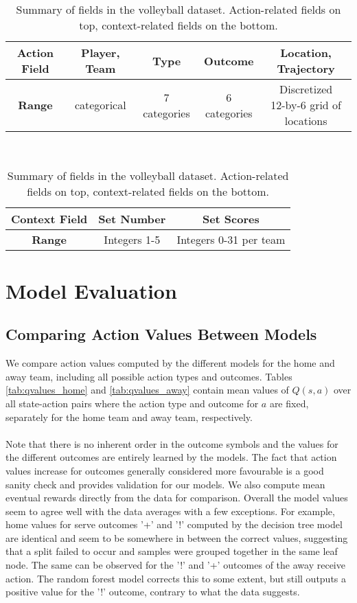 \documentclass{sfuthesis}
\begin{document}
	\begin{table}[ht]
		\centering
		\begin{tabular}{c|c|c|c|c}
			\textbf{Action Field} & \textbf{Player, Team} & \textbf{Type} & \textbf{Outcome} & \textbf{Location, Trajectory}         \\ \hline
			\textbf{Range} & categorical           & 7 categories  & 6 categories     & \makecell[c]{Discretized\\ 12-by-6 grid of locations}
		\end{tabular}
		\\ \vspace{0.75cm}
		\begin{tabular}{c|c|c}
			\textbf{Context Field} & \textbf{Set Number} & \textbf{Set Scores}    \\ \hline
			\textbf{Range} & Integers 1-5        & Integers 0-31 per team
		\end{tabular}
		\caption{Summary of fields in the volleyball dataset. Action-related fields on top, context-related fields on the bottom.}
		\label{tab:data-fields}
	\end{table}
	
	\chapter{Model Evaluation}
	
	\section{Comparing Action Values Between Models}
	
	We compare action values computed by the different models for the home and away team, including all possible action types and outcomes. Tables \ref{tab:qvalues_home} and \ref{tab:qvalues_away} contain mean values of $Q(s,a)$ over all state-action pairs where the action type and outcome for $a$ are fixed, separately for the home team and away team, respectively.\\\\
	Note that there is no inherent order in the outcome symbols and the values for the different outcomes are entirely learned by the models. The fact that action values increase for outcomes generally considered more favourable is a good sanity check and provides validation for our models. We also compute mean eventual rewards directly from the data for comparison. Overall the model values seem to agree well with the data averages with a few exceptions. For example, home values for serve outcomes '+' and '!' computed by the decision tree model are identical and seem to be somewhere in between the correct values, suggesting that a split failed to occur and samples were grouped together in the same leaf node. The same can be observed for the '!' and '+' outcomes of the away receive action. The random forest model corrects this to some extent, but still outputs a positive value for the '!' outcome, contrary to what the data suggests.
	
\end{document}
